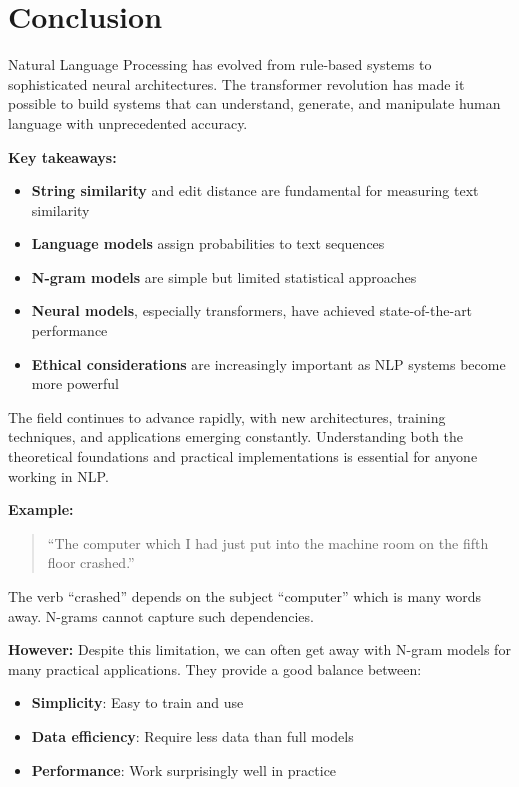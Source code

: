 \documentclass[11pt,a4paper]{article}
\theoremstyle{definition}
\theoremstyle{plain}
\theoremstyle{remark}
\begin{document}
\section{Conclusion}

Natural Language Processing has evolved from rule-based systems to sophisticated neural architectures. The transformer revolution has made it possible to build systems that can understand, generate, and manipulate human language with unprecedented accuracy.

\textbf{Key takeaways:}
\begin{itemize}
    \item \textbf{String similarity} and edit distance are fundamental for measuring text similarity
    \item \textbf{Language models} assign probabilities to text sequences
    \item \textbf{N-gram models} are simple but limited statistical approaches
    \item \textbf{Neural models}, especially transformers, have achieved state-of-the-art performance
    \item \textbf{Ethical considerations} are increasingly important as NLP systems become more powerful
\end{itemize}

The field continues to advance rapidly, with new architectures, training techniques, and applications emerging constantly. Understanding both the theoretical foundations and practical implementations is essential for anyone working in NLP.

\textbf{Example:}
\begin{quote}
``The computer which I had just put into the machine room on the fifth floor crashed.''
\end{quote}

The verb ``crashed'' depends on the subject ``computer'' which is many words away. N-grams cannot capture such dependencies.

\textbf{However:} Despite this limitation, we can often get away with N-gram models for many practical applications. They provide a good balance between:
\begin{itemize}
    \item \textbf{Simplicity}: Easy to train and use
    \item \textbf{Data efficiency}: Require less data than full models
    \item \textbf{Performance}: Work surprisingly well in practice
\end{itemize}
\end{document}
